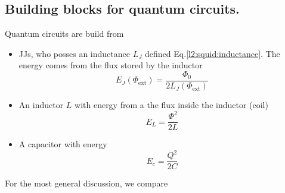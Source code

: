    \subsection{Building blocks for quantum circuits.}
   Quantum circuits are build from
   \begin{itemize}
   \item  JJs, who  posses an  inductance $L_J$  defined Eq.\eqref{l2:squid:inductance}.   The
     energy comes from the flux stored by the inductor
     \begin{equation}
       E_J(\Phi_\text{ext}) = \frac{\Phi_0}{2L_J(\Phi_\text{ext})}
     \end{equation}
   \item An inductor $L$ with energy from a the flux inside the inductor (coil)
     \begin{equation}
       E_L = \frac{\Phi^2}{2L} 
     \end{equation}
   \item A capacitor with energy
     \begin{equation}
       E_c = \frac{Q^2}{2C}
     \end{equation}
   \end{itemize}
   
   For the most general discussion, we compare
  

